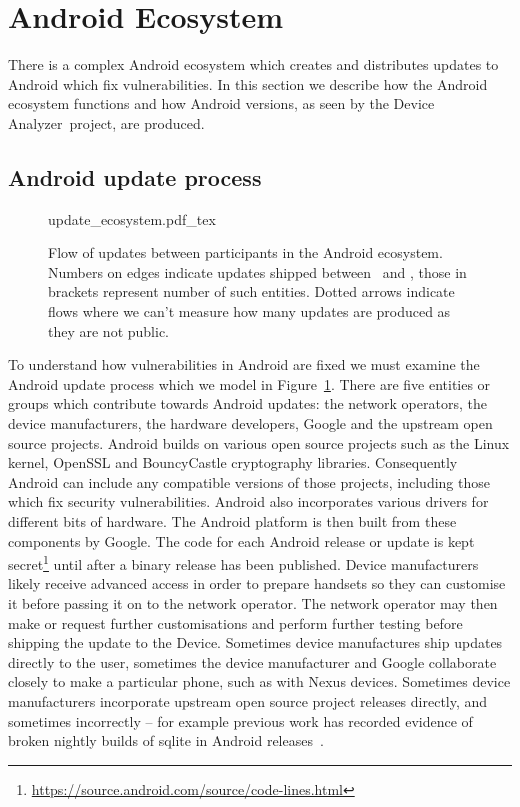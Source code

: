 \documentclass{sig-alternate}
\newcommand{\da}{Device Analyzer}
\begin{document}
\section{Android Ecosystem}\label{sec:android_ecosystem}
There is a complex Android ecosystem which creates and distributes updates to Android which fix vulnerabilities.
In this section we describe how the Android ecosystem functions and how Android versions, as seen by the \da\ project, are produced.


\subsection{Android update process}

\label{sec:android_update_process}
\begin{figure}[h]
 \centering
 \def\svgwidth{\columnwidth}
 {update_ecosystem.pdf_tex}
 \caption{Flow of updates between participants in the Android ecosystem.
 Numbers on edges indicate updates shipped between \daStartDate\ and \daEndDate, those in brackets represent number of such entities.
 Dotted arrows indicate flows where we can't measure how many updates are produced as they are not public.}
 \label{fig:update_ecosystem}
\end{figure}
To understand how vulnerabilities in Android are fixed we must examine the Android update process which we model in Figure~\ref{fig:update_ecosystem}.
There are five entities or groups which contribute towards Android updates: the network operators, the device manufacturers, the hardware developers, Google and the upstream open source projects.
Android builds on various open source projects such as the Linux kernel, OpenSSL and BouncyCastle cryptography libraries.
Consequently Android can include any compatible versions of those projects, including those which fix security vulnerabilities.
Android also incorporates various drivers for different bits of hardware.
The Android platform is then built from these components by Google.
The code for each Android release or update is kept secret\footnote{\url{https://source.android.com/source/code-lines.html}} until after a binary release has been published.
Device manufacturers likely receive advanced access in order to prepare handsets so they can customise it before passing it on to the network operator.
The network operator may then make or request further customisations and perform further testing before shipping the update to the Device.
Sometimes device manufactures ship updates directly to the user, sometimes the device manufacturer and Google collaborate closely to make a particular phone, such as with Nexus devices.
Sometimes device manufacturers incorporate upstream open source project releases directly, and sometimes incorrectly -- for example previous work has recorded evidence of broken nightly builds of sqlite in Android releases~\cite{Wagner2013}.
\end{document}
